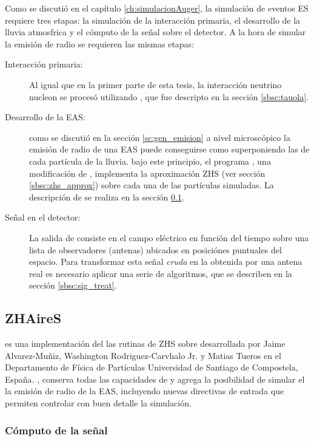 	Como se discuti\'o en el cap\'itulo \ref{ch:simulacionAuger}, la simulaci\'on de eventos ES requiere tres etapas: la simulaci\'on de la interacci\'on primaria, el desarrollo de la lluvia atmosfrica y el c\'omputo de la se\~nal sobre el detector.
	A la hora de simular la emisi\'on de radio se requieren las mismas etapas:
	\begin{description}
		\item[Interacción primaria:] Al igual que en la primer parte de esta tesis, la interacci\'on neutrino nucleon se proces\'o utilizando \tauola{}, que fue descripto en la secci\'on \ref{sbsc:tauola}.
		\item[Desarrollo de la EAS:] como se discuti\'o en la secci\'on \ref{sc:gen_emision} a nivel microsc\'opico la emisi\'on de radio de una EAS puede conseguirse como superponiendo las de cada part\'icula de la lluvia. bajo este principio, el programa \zhs{}, una modificaci\'on de \aires{}, implementa la aproximaci\'on ZHS (ver secci\'on \ref{sbsc:zhs_approx}) sobre cada una de las part\'iculas simuladas. La descripci\'on de \zhs{} se realiza en la secci\'on \ref{sbsc:zhaires}.
		\item[Señal en el detector:] La salida de \zhs{} consiste en el campo el\'ectrico en funci\'on del tiempo sobre una lista de observadores (antenas) ubicados en posici\'ones puntuales del espacio. Para transformar esta se\~nal \emph{cruda} en la obtenida por una antena real es necesario aplicar una serie de algoritmos, que se describen en la secci\'on \ref{sbsc:sig_treat}.
	\end{description}
	
	\subsection{ZHAireS}
	\label{sbsc:zhaires}

	\zhs{} es una implementaci\'on del las rutinas de ZHS \cite{1_halzen_zas_stanev_1991,2_zas_halzen_stanev_1992} sobre \aires{} desarrollada por Jaime Alvarez-Muñiz, Washington Rodriguez-Carvhalo Jr. y Matias Tueros en el Departamento de Física de Partículas Universidad de Santiago de Compostela, España.
	\zhs{}, conserva todas las capacidades de \aires{} y agrega la posibilidad de simular el la emisi\'on de radio de la EAS, incluyendo nuevas directivas de entrada que permiten controlar con buen detalle la simulación.
	
		\subsubsection{C\'omputo de la se\~nal}
		
